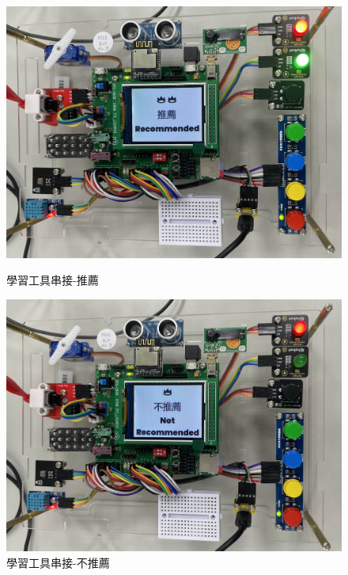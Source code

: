 \begin{figure}[htbp!]
	\centering
	\begin{minipage}{0.4\linewidth}
		\includegraphics[width=\linewidth]{images/w6/learning-tool-recommend.jpg}
		\caption{學習工具串接-推薦}
	\end{minipage}
	\begin{minipage}{0.4\linewidth}
		\includegraphics[width=\linewidth]{images/w6/learning-tool-NOTrecommend.jpg}
		\caption{學習工具串接-不推薦}
	\end{minipage}
\end{figure}
